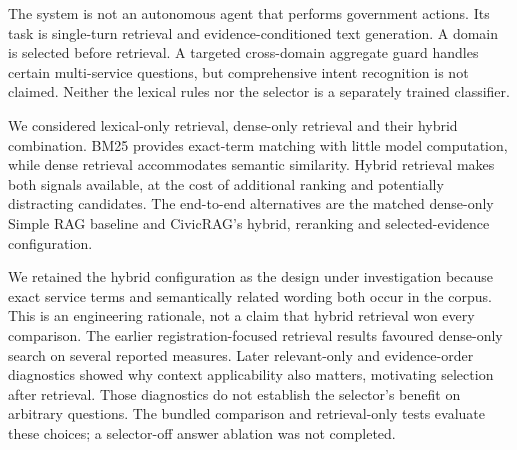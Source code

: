 The system is not an autonomous agent that performs government actions. Its task is single-turn retrieval and evidence-conditioned text generation. A domain is selected before retrieval. A targeted cross-domain aggregate guard handles certain multi-service questions, but comprehensive intent recognition is not claimed. Neither the lexical rules nor the selector is a separately trained classifier.

We considered lexical-only retrieval, dense-only retrieval and their hybrid combination. BM25 provides exact-term matching with little model computation, while dense retrieval accommodates semantic similarity. Hybrid retrieval makes both signals available, at the cost of additional ranking and potentially distracting candidates. The end-to-end alternatives are the matched dense-only Simple RAG baseline and CivicRAG's hybrid, reranking and selected-evidence configuration.

We retained the hybrid configuration as the design under investigation because exact service terms and semantically related wording both occur in the corpus. This is an engineering rationale, not a claim that hybrid retrieval won every comparison. The earlier registration-focused retrieval results favoured dense-only search on several reported measures. Later relevant-only and evidence-order diagnostics showed why context applicability also matters, motivating selection after retrieval. Those diagnostics do not establish the selector's benefit on arbitrary questions. The bundled comparison and retrieval-only tests evaluate these choices; a selector-off answer ablation was not completed.

